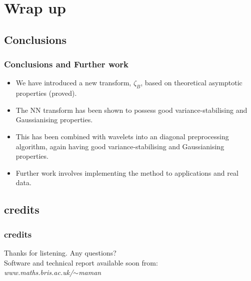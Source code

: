 \documentclass{beamer}
\begin{document}
\section{Wrap up}
\subsection{Conclusions}
\begin{frame}
\frametitle{Conclusions and Further work}
\begin{itemize}
\item We have introduced a new transform, $\zeta_B$, based on theoretical asymptotic properties (proved).\pause
\item The NN transform has been shown to possess good variance-stabilising and Gaussianising
properties.\pause
\item This has been combined with wavelets into an diagonal preprocessing algorithm, again having good variance-stabilising and
Gaussianising properties. \pause
\item  Further work involves implementing the method to applications and real
data.
\end{itemize}
\end{frame}

\subsection{credits}
\begin{frame}
\frametitle{credits} Thanks for listening.  Any questions?\\
\vspace{.5cm}
Software and technical report available soon from:\\
\vspace{.4cm} \centering
{\it{www.maths.bris.ac.uk/$\sim$maman}}\\
\vspace{.6cm} \\
\end{frame}
\end{document}

